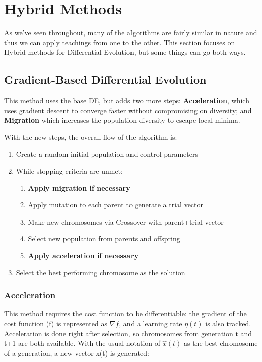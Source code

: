 \section{Hybrid Methods}
As we've seen throughout, many of the algorithms are fairly similar in nature and thus we can apply teachings from one to the other. This section focuses on Hybrid methods for Differential Evolution, but some things can go both ways.

\subsection{Gradient-Based Differential Evolution}
This method uses the base DE, but adds two more steps: \textbf{Acceleration}, which uses gradient descent to converge faster without compromising on diversity; and \textbf{Migration} which increases the population diversity to escape local minima.

With the new steps, the overall flow of the algorithm is: 
\begin{enumerate}[label=\Alph*]
\item Create a random initial population and control parameters
\item While stopping criteria are unmet:
\begin{enumerate}[label=\arabic*]
    \item \textbf{Apply migration if necessary }
    \item Apply mutation to each parent to generate a trial vector
    \item Make new chromosomes via Crossover with parent+trial vector
    \item Select new population from parents and offspring
    \item \textbf{Apply acceleration if necessary }
\end{enumerate}
\item Select the best performing chromosome as the solution\\
\end{enumerate}

\subsubsection{Acceleration}
This method requires the cost function to be differentiable: the gradient of the cost function (f) is represented as $\nabla f$, and a learning rate $\eta(t)$ is also tracked. Acceleration is done right after selection, so chromosomes from generation t and t+1 are both available. With the usual notation of $\hat{x}(t)$ as the best chromosome of a generation, a new vector x(t) is generated:

